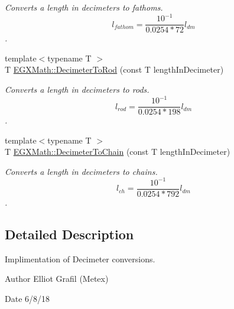 \begin{DoxyCompactItemize}
\begin{DoxyCompactList}\small\item\em Converts a length in decimeters to fathoms. \[ l_{fathom}= \frac{10^{-1}}{0.0254 * 72} l_{dm} \]. \end{DoxyCompactList}\item 
{\footnotesize template$<$typename T $>$ }\\T \mbox{\hyperlink{group___e_g_x_math-_conversions-_length_conversions-_s_i-_decimeter-_surveyors_gaf34122272f5724db35f8400d284e2ec8}{E\+G\+X\+Math\+::\+Decimeter\+To\+Rod}} (const T length\+In\+Decimeter)
\begin{DoxyCompactList}\small\item\em Converts a length in decimeters to rods. \[ l_{rod}= \frac{10^{-1}}{0.0254 * 198} l_{dm} \]. \end{DoxyCompactList}\item 
{\footnotesize template$<$typename T $>$ }\\T \mbox{\hyperlink{group___e_g_x_math-_conversions-_length_conversions-_s_i-_decimeter-_surveyors_gaae746f9b34bc92e17f9117f5b139fdc4}{E\+G\+X\+Math\+::\+Decimeter\+To\+Chain}} (const T length\+In\+Decimeter)
\begin{DoxyCompactList}\small\item\em Converts a length in decimeters to chains. \[ l_{ch}= \frac{10^{-1}}{0.0254 * 792} l_{dm} \]. \end{DoxyCompactList}\end{DoxyCompactItemize}


\subsection{Detailed Description}
Implimentation of Decimeter conversions. 

\begin{DoxyAuthor}{Author}
Elliot Grafil (Metex) 
\end{DoxyAuthor}
\begin{DoxyDate}{Date}
6/8/18 
\end{DoxyDate}
